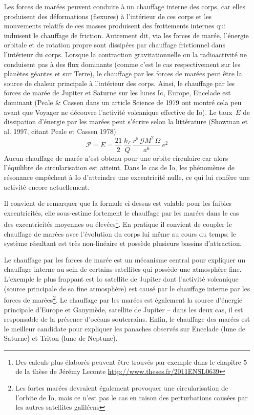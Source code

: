 
\sk
Les forces de marées peuvent conduire à un chauffage interne des corps,
car elles produisent des déformations (flexures) à l'intérieur de ces corps
et les mouvements relatifs de ces masses produisent des frottements internes
qui induisent le chauffage de friction.
Autrement dit, via les forces de marée, l'énergie orbitale et de rotation propre sont dissipées par chauffage frictionnel dans l'intérieur du corps.
Lorsque la contraction gravitationnelle ou la radioactivité ne conduisent
pas à des flux dominants (comme c'est le cas respectivement sur les planètes géantes et sur Terre),
le chauffage par les forces de marées
peut être la source de chaleur principale à l'intérieur des corps.
Ainsi, le chauffage par les forces de marée de Jupiter et Saturne sur 
les lunes Io, Europe, Encelade est dominant
(Peale \& Cassen dans un article Science de 1979 ont
montré cela peu avant que Voyager ne découvre l'activité
volcanique effective de Io).
Le taux~$\dot{E}$ de dissipation d'énergie par les marées peut s'écrire
selon la littérature (Showman et al. 1997, citant Peale et Cassen 1978)
\[ \mathcal{P} = \dot{E} = \frac{21}{2} \, \frac{k_T}{Q} \, \frac{r^5\,\mathcal{G}M^2\,\Omega}{a^6} \, e^2 \]
\noindent Aucun chauffage de marée n'est obtenu pour une orbite circulaire
car alors l'équilibre de circularisation est atteint.
Dans le cas de Io, les phénomènes de résonance empêchent
à Io d'atteindre une excentricité nulle, ce qui lui
confère une activité encore actuellement.

\sk
Il convient de remarquer que la formule ci-dessus est valable
pour les faibles excentricités, elle sous-estime fortement
le chauffage par les marées dans le cas des excentricités moyennes 
ou élevées\footnote{Des calculs plus élaborés peuvent être trouvés par exemple
dans le chapitre 5 de la thèse de Jérémy Leconte \url{http://www.theses.fr/2011ENSL0639}}.
En pratique il convient de coupler le chauffage de marées
avec l'évolution du corps lui même au cours du temps;
le système résultant est très non-linéaire
et possède plusieurs bassins d'attraction.

\sk
Le chauffage par les forces de marée est un mécanisme central pour
expliquer un chauffage interne au sein de certains satellites
qui possède une atmosphère fine. L'exemple le plus frappant
est Io satellite de Jupiter dont l'activité volcanique
(source principale de sa fine atmosphère)
est causé par le chauffage interne par les forces de 
marées\footnote{Les fortes marées devraient également provoquer
une circularisation de l'orbite de Io, mais ce n'est pas le cas
en raison des perturbations causées par les autres satellites galiléens}.
Le chauffage par les marées est également la source d'énergie
principale d'Europe et Ganymède, satellite de Jupiter -- dans les
deux cas, il est responsable de la présence d'océans souterrains.
Enfin, le chauffage des marées est le meilleur candidate pour
expliquer les panaches observés sur Encelade (lune de Saturne)
et Triton (lune de Neptune).









